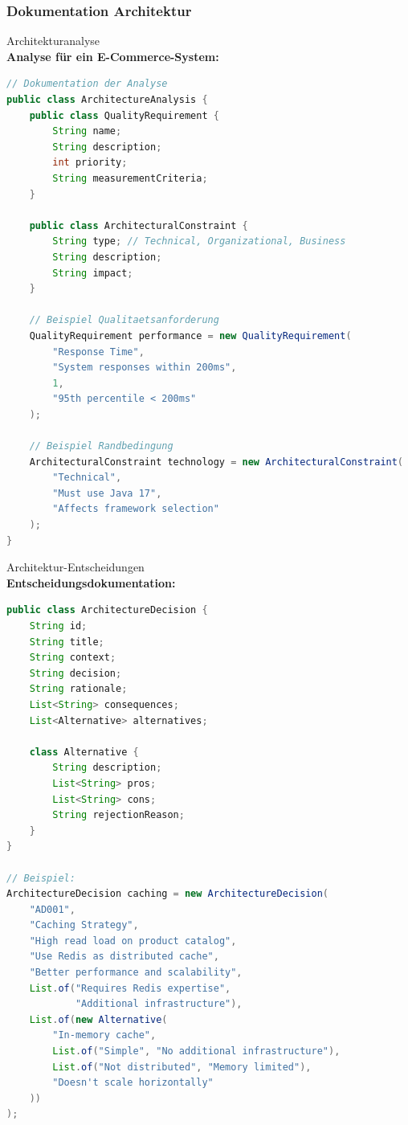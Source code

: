 \subsubsection{Dokumentation Architektur}

\begin{example2}{Architekturanalyse}\\
\textbf{Analyse für ein E-Commerce-System:}

\begin{lstlisting}[language=Java, style=basesmol]
// Dokumentation der Analyse
public class ArchitectureAnalysis {
    public class QualityRequirement {
        String name;
        String description;
        int priority;
        String measurementCriteria;
    }
    
    public class ArchitecturalConstraint {
        String type; // Technical, Organizational, Business
        String description;
        String impact;
    }
    
    // Beispiel Qualitaetsanforderung
    QualityRequirement performance = new QualityRequirement(
        "Response Time",
        "System responses within 200ms",
        1,
        "95th percentile < 200ms"
    );
    
    // Beispiel Randbedingung
    ArchitecturalConstraint technology = new ArchitecturalConstraint(
        "Technical",
        "Must use Java 17",
        "Affects framework selection"
    );
}
\end{lstlisting}
\end{example2}

\begin{example2}{Architektur-Entscheidungen}\\
\textbf{Entscheidungsdokumentation:}

\begin{lstlisting}[language=Java, style=basesmol]
public class ArchitectureDecision {
    String id;
    String title;
    String context;
    String decision;
    String rationale;
    List<String> consequences;
    List<Alternative> alternatives;
    
    class Alternative {
        String description;
        List<String> pros;
        List<String> cons;
        String rejectionReason;
    }
}

// Beispiel:
ArchitectureDecision caching = new ArchitectureDecision(
    "AD001",
    "Caching Strategy",
    "High read load on product catalog",
    "Use Redis as distributed cache",
    "Better performance and scalability",
    List.of("Requires Redis expertise", 
            "Additional infrastructure"),
    List.of(new Alternative(
        "In-memory cache",
        List.of("Simple", "No additional infrastructure"),
        List.of("Not distributed", "Memory limited"),
        "Doesn't scale horizontally"
    ))
);
\end{lstlisting}
\end{example2}

